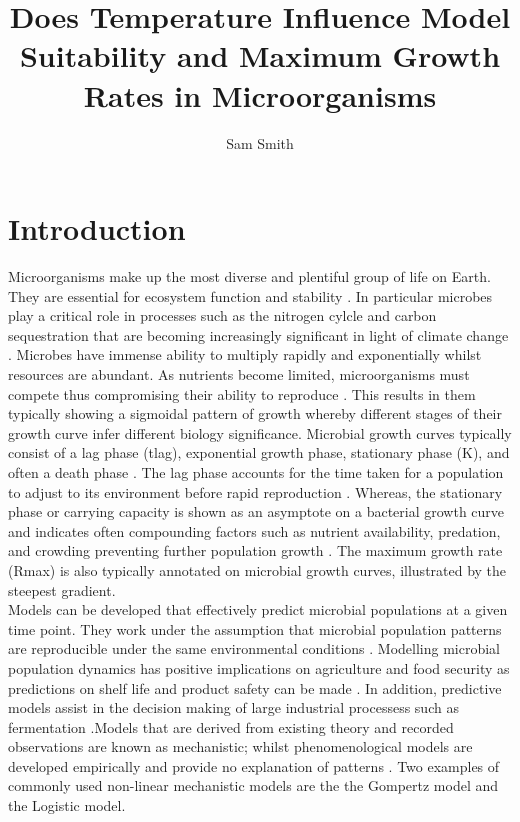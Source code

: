 \documentclass[11pt]{article}
\title{\vspace{+0cm}Does Temperature Influence Model Suitability and Maximum Growth Rates in Microorganisms}
\author{Sam Smith}
\date{}
\begin{document}
  \maketitle
    
  \begin{abstract}
    
  \end{abstract}
  
  \section{Introduction}
  \linenumbers
Microorganisms make up the most diverse and plentiful group of life on Earth. They are essential for ecosystem function and stability \cite{Shoemaker2021}. In particular microbes play a critical role in processes such as the nitrogen cylcle and carbon sequestration that are becoming increasingly significant in light of climate change \cite{Gupta2016}. Microbes have immense ability to multiply rapidly and exponentially whilst resources are abundant. As nutrients become limited, microorganisms must compete thus compromising their ability to reproduce \cite{NatRevMicro}. This results in them typically showing a sigmoidal pattern of growth whereby different stages of their growth curve infer different biology significance. Microbial growth curves typically consist of a lag phase (tlag), exponential growth phase, stationary phase (K), and often a death phase \cite{Zwietering1990}. The lag phase accounts for the time taken for a population to adjust to its environment before rapid reproduction \cite{BUCHANAN1997313}. Whereas, the stationary phase or carrying capacity is shown as an asymptote on a bacterial growth curve and indicates often compounding factors such as nutrient availability, predation, and crowding preventing further population growth \cite{WACHENHEIM2003157}. The maximum growth rate (Rmax) is also typically annotated on microbial growth curves, illustrated by the steepest gradient.\\
     
Models can be developed that effectively predict microbial populations at a given time point. They work under the assumption that microbial population patterns are reproducible under the same environmental conditions \cite{Pla2015}. Modelling microbial population dynamics has positive implications on agriculture and food security as predictions on shelf life and product safety can be made \cite{Zwietering1990}. In addition, predictive models assist in the decision making of large industrial processess such as fermentation \cite{Garcia2021}.Models that are derived from existing theory and recorded observations are known as mechanistic; whilst phenomenological models are developed empirically and provide no explanation of patterns \cite{doi:10.1080/10408398.2011.570463}. Two examples of commonly used non-linear mechanistic models are the the Gompertz model and the Logistic model.\\
\end{document}
